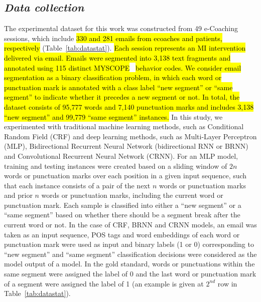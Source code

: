 \documentclass{amia}
\begin{document}
\subsection*{\textit{Data collection}}
The experimental dataset for this work was constructed from 49 e-Coaching sessions, which include \hl{330 and 281 emails from ecoaches and patients, respectively }(Table~\ref{tab:datastat}). \hl{Each session represents an MI intervention delivered via email. Emails were segmented into 3,138 text fragments and annotated using 115 distinct MYSCOPE}~\cite{carcone2013provider} \hl{behavior codes. We consider email segmentation as a binary classification problem, in which each word or punctuation mark is annotated with a class label ``new segment'' or ``same segment'' to indicate whether it precedes a new segment or not. In total, the dataset consists of 95,777 words and 7,140 punctuation marks and includes 3,138 ``new segment'' and 99,779 ``same segment'' instances.} In this study, we experimented with traditional machine learning methods, such as Conditional Random Field (CRF)\cite{lafferty2001conditional} and deep learning methods, such as Multi-Layer Perceptron (MLP),\cite{rumelhart1986learning} Bidirectional Recurrent Neural Network (bidirectional RNN or BRNN)\cite{schuster1997bidirectional} and Convolutional Recurrent Neural Network (CRNN).\cite{treviso2017sentence} For an MLP model, training and testing instances were created based on a sliding window of $2n$ words or punctuation marks over each position in a given input sequence, such that each instance consists of a pair of the next $n$ words or punctuation marks and prior $n$ words or punctuation marks, including the current word or punctuation mark. Each sample is classified into either a ``new segment'' or a ``same segment'' based on whether there should be a segment break after the current word or not. In the case of CRF, BRNN and CRNN models, an email was taken as an input sequence, POS tags and word embeddings of each word or punctuation mark were used as input and binary labels (1 or 0) corresponding to ``new segment'' and ``same segment'' classification decisions were considered as the model output of a model. In the gold standard, words or punctuations within the same segment were assigned the label of 0 and the last word or punctuation mark of a segment were assigned the label of 1 (an example is given at $2^{nd}$ row in Table~\ref{tab:datastat}). \\ 
\end{document}
